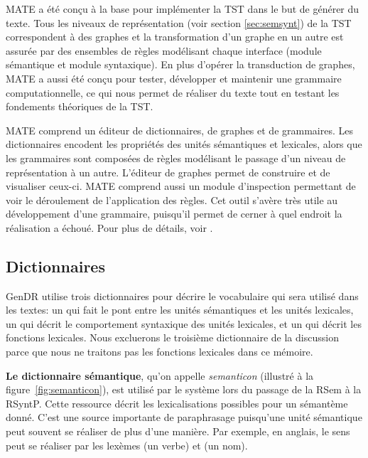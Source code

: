 MATE a été conçu à la base pour implémenter la \ac{TST} dans le but de générer du texte. Tous les niveaux de représentation (voir section \ref{sec:semsynt}) de la \ac{TST} correspondent à des graphes et la transformation d'un graphe en un autre est assurée par des ensembles de règles modélisant chaque interface (module sémantique et module syntaxique). En plus d'opérer la transduction de graphes, MATE a aussi été conçu pour tester, développer et maintenir une grammaire computationnelle, ce qui nous permet de réaliser du texte tout en testant les fondements théoriques de la \ac{TST}.

MATE comprend un éditeur de dictionnaires, de graphes et de grammaires. Les dictionnaires encodent les propriétés des unités sémantiques et lexicales, alors que les grammaires sont composées de règles modélisant le passage d'un niveau de représentation à un autre. L'éditeur de graphes permet de construire et de visualiser ceux-ci. MATE comprend aussi un module d'inspection permettant de voir le déroulement de l'application des règles. Cet outil s'avère très utile au développement d'une grammaire, puisqu'il permet de cerner à quel endroit la réalisation a échoué. Pour plus de détails, voir \cite{BohnetOpensourcegraph2010,LambreyImplementationcollocationspour2017,LambreyGECOv1User2016}.


\subsection{Dictionnaires}\label{sec:dictio}

GenDR utilise trois dictionnaires pour décrire le vocabulaire qui sera utilisé dans les textes: un qui fait le pont entre les unités sémantiques et les unités lexicales, un qui décrit le comportement syntaxique des unités lexicales, et un qui décrit les fonctions lexicales. Nous excluerons le troisième dictionnaire de la discussion parce que nous ne traitons pas les fonctions lexicales dans ce mémoire.

\textbf{Le dictionnaire sémantique}, qu'on appelle \emph{semanticon} (illustré à la figure~\ref{fig:semanticon}), est utilisé par le système lors du passage de la \ac{RSem} à la \ac{RSyntP}. Cette ressource décrit les lexicalisations possibles pour un sémantème donné. C'est une source importante de paraphrasage puisqu'une unité sémantique peut souvent se réaliser de plus d'une manière. Par exemple, en anglais, le sens  peut se réaliser par les lexèmes  (un verbe) et  (un nom).

